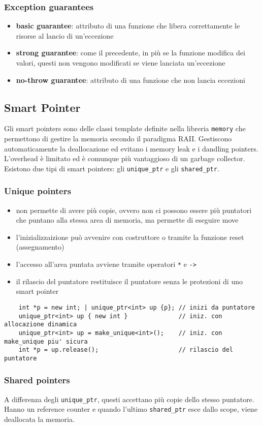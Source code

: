 \documentclass[a4paper]{article}
\begin{document}
\subsubsection*{Exception guarantees}
\begin{itemize}
	\item \textbf{basic guarantee}: attributo di una funzione che libera correttamente le risorse al lancio di un'eccezione
	\item \textbf{strong guarantee}: come il precedente, in più se la funzione modifica dei valori, questi non vengono modificati
	se viene lanciata un'eccezione
	\item \textbf{no-throw guarantee}: attributo di una funzione che non lancia eccezioni
\end{itemize}

\subsection{Smart Pointer}
Gli smart pointers sono delle classi template definite nella libreria \verb|memory| che permettono di gestire la memoria secondo
il paradigma RAII. Gestiscono automaticamente la deallocazione ed evitano i memory leak e i dandling pointers. L'overhead è
limitato ed è comunque più vantaggioso di un garbage collector. Esistono due tipi di smart pointers: gli \verb|unique_ptr| e
gli \verb|shared_ptr|.

\subsubsection*{Unique pointers}
\begin{itemize}
	\item non permette di avere più copie, ovvero non ci possono essere più puntatori che puntano alla stessa area di memoria, 
	ma permette di eseguire move
	\item l'inizializzaizione può avvenire con costruttore o tramite la funzione reset (assegnamento)
	\item l'accesso all'area puntata avviene tramite operatori \verb|*| e \verb|->|
	\item il rilascio del puntatore restituisce il puntatore senza le protezioni di uno smart pointer
\end{itemize}
\begin{lstlisting}
	int *p = new int; | unique_ptr<int> up {p}; // inizi da puntatore
	unique_ptr<int> up { new int }              // iniz. con allocazione dinamica
	unique_ptr<int> up = make_unique<int>();    // iniz. con make_unique piu' sicura
	int *p = up.release();                      // rilascio del puntatore
\end{lstlisting}

\subsubsection*{Shared pointers}
A differenza degli \verb|unique_ptr|, questi accettano più copie dello stesso puntatore. Hanno un reference counter e quando l'ultimo
\verb|shared_ptr| esce dallo scope, viene deallocata la memoria.
\end{document}
